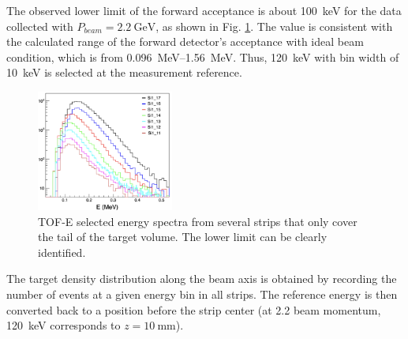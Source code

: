 \documentclass[fleqn,twocolumn,a4paper]{ikpar}
\begin{document}
The observed lower limit of the forward acceptance is about \SI{100}{\keV} for
the data collected with $P_{beam} = \SI{2.2}{\GeV}$, as shown in Fig. \ref{fig:spectrums}.
The value is consistent with the calculated range of the forward detector's
acceptance with ideal beam condition, which is from \SIrange{0.096}{1.56}{\MeV}.
Thus, \SI{120}{keV} with bin width of \SI{10}{\keV} is selected at the
measurement reference.
\begin{figure}[htb!]
  \centering
	\includegraphics[width=0.4\textwidth]{./spectrums.png}
  \caption{TOF-E selected energy spectra from several strips that only cover the tail of the target volume. The lower limit can be clearly identified.}
  \label{fig:spectrums}
\end{figure}
The target density distribution along the beam axis is obtained by recording the
number of events at a given energy bin in all strips.
The reference energy is then converted back to a position before the strip center
(at \SI{2.2}{\momentum} beam momentum, \SI{120}{\keV} corresponds to $z=\SI{10}{\mm}$).
\end{document}

